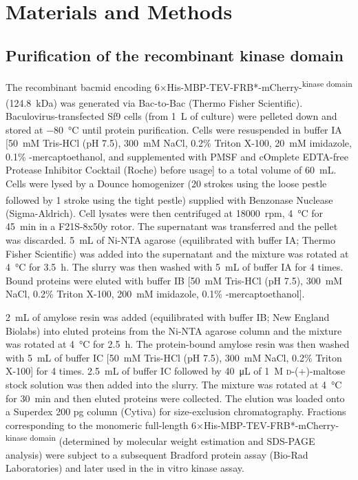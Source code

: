 \section{Materials and Methods}
\subsection{Purification of the recombinant  kinase domain}
\label{RecombinantMPS1KDPurification}
The recombinant bacmid encoding 6×His-MBP-TEV-FRB*-mCherry-\textsuperscript{kinase domain} (\SI{124.8}{kDa}) was generated %
via Bac-to-Bac\textsuperscript{\textregistered} (Thermo Fisher Scientific). Baculovirus-transfected Sf9 cells (from \SI{1}{L} of culture) were pelleted down and stored at \SI{-80}{\celsius} until protein purification. Cells were resuspended in buffer IA [\SI{50}{mM} Tris-HCl (pH 7.5), \SI{300}{mM} NaCl, 0.2\% Triton X-100, \SI{20}{mM} imidazole, 0.1\% \textbeta-mercaptoethanol, and supplemented with PMSF and cOmplete\texttrademark{} EDTA-free Protease Inhibitor Cocktail (Roche) before usage] to a total volume of \SI{60}{mL}. Cells were lysed by a Dounce homogenizer (20 strokes using the loose pestle followed by 1 stroke using the tight pestle) supplied with Benzonase\textsuperscript{\textregistered} Nuclease (Sigma-Aldrich). Cell lysates were then centrifuged at \SI{18000}{rpm}, \SI{4}{\celsius} for \SI{45}{min} in a F21S-8x50y rotor. The supernatant was transferred and the pellet was discarded. \SI{5}{mL} of Ni-NTA agarose (equilibrated with buffer IA; Thermo Fisher Scientific) was added into the supernatant and the mixture was rotated at \SI{4}{\celsius} for \SI{3.5}{h}. The slurry was then washed with \SI{5}{mL} of buffer IA for 4 times. Bound proteins were eluted with buffer IB [\SI{50}{mM} Tris-HCl (pH 7.5), \SI{300}{mM} NaCl, 0.2\% Triton X-100, \SI{200}{mM} imidazole, 0.1\% \textbeta-mercaptoethanol].

\SI{2}{mL} of amylose resin was added (equilibrated with buffer IB; New England Biolabs) into eluted proteins from the Ni-NTA agarose column and the mixture was rotated at \SI{4}{\celsius} for \SI{2.5}{h}. The protein-bound amylose resin was then washed with \SI{5}{mL} of buffer IC [\SI{50}{mM} Tris-HCl (pH 7.5), \SI{300}{mM} NaCl, 0.2\% Triton X-100] for 4 times. \SI{2.5}{mL} of buffer IC followed by \SI{40}{\micro L} of \SI{1}{M} \textsc{d}-(+)-maltose stock solution was then added into the slurry. The mixture was rotated at \SI{4}{\celsius} for \SI{30}{min} and then eluted proteins were collected. The elution was loaded onto a Superdex 200 pg column (Cytiva) for size-exclusion chromatography. Fractions corresponding to the monomeric full-length 6×His-MBP-TEV-FRB*-mCherry-\textsuperscript{kinase domain} (determined by molecular weight estimation and SDS-PAGE analysis) were subject to a subsequent Bradford protein assay (Bio-Rad Laboratories) and later used in the in vitro kinase assay.

